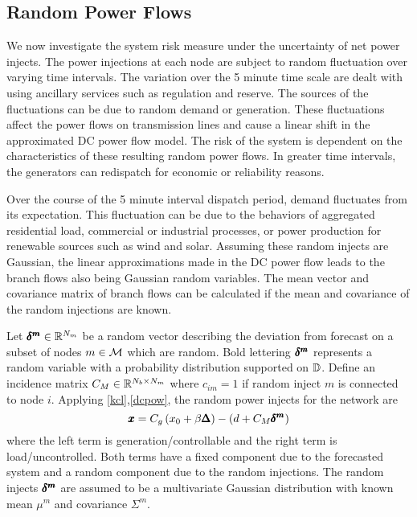 \subsection{Random Power Flows}
We now investigate the system risk measure under the uncertainty of net power injects.  The power injections at each node are subject to random fluctuation over varying time intervals.  The variation over the 5 minute time scale are dealt with using ancillary services such as regulation and reserve.  The sources of the fluctuations can be due to random demand or generation.  These fluctuations affect the power flows on transmission lines and cause a linear shift in the approximated DC power flow model.  The risk of the system is dependent on the characteristics of these resulting random power flows.  In greater time intervals, the generators can redispatch for economic or reliability reasons.


Over the course of the 5 minute interval dispatch period, demand  fluctuates from its expectation.  This  fluctuation can be due to the behaviors of aggregated residential load, commercial or industrial processes, or power production for renewable sources such as wind and solar.  Assuming these random injects are Gaussian, the linear approximations made in the DC power flow leads to the branch flows also being Gaussian random variables.  The mean vector and covariance matrix of branch flows can be calculated if the mean and covariance of the random injections are known.

Let $\pmb{\delta^m} \in \mathbb{R}^{N_m}$ be a random vector describing the deviation from forecast on a subset of nodes $m \in \mathcal{M}$ which are random.  Bold lettering $\pmb{\delta^m}$ represents a random variable with a probability distribution supported on $\mathbb{D}$.  Define an incidence matrix $C_M \in \mathbb{R}^{N_b \times N_m}$ where $c_{im}=1$ if random inject $m$ is connected to node $i$.  Applying \ref{kcl},\ref{dcpow}, the random power injects for the network are
\begin{equation}\label{rand_inj}
 \pmb{x} = C_g\left(x_0+\beta \pmb{\Delta}\right) - (d + C_M \pmb{\delta^m}) 
\end{equation}
 where the left term is generation/controllable and the right term is load/uncontrolled.  Both terms have a fixed component due to the forecasted system and a random component due to the random injections.  The random injects $\pmb{\delta^m}$ are assumed to be a multivariate Gaussian distribution with known mean $\mu^m$ and covariance $\Sigma^m$.  


